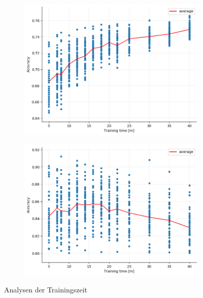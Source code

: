 \begin{figure}
  \centering
  \begin{subfigure}[c]{0.45\textwidth}
    \centering
    \includegraphics[width=\textwidth]{images/train_duration_shuffle.png}
    \label{fig:train_duration_shuffle}
  \end{subfigure}
  \hfill
  \begin{subfigure}[c]{0.45\textwidth}
    \centering
    \includegraphics[width=\textwidth]{images/train_duration_start.png}
    \label{fig:train_duration_start}
  \end{subfigure}
  \caption{Analysen der Trainingszeit}
\end{figure}

